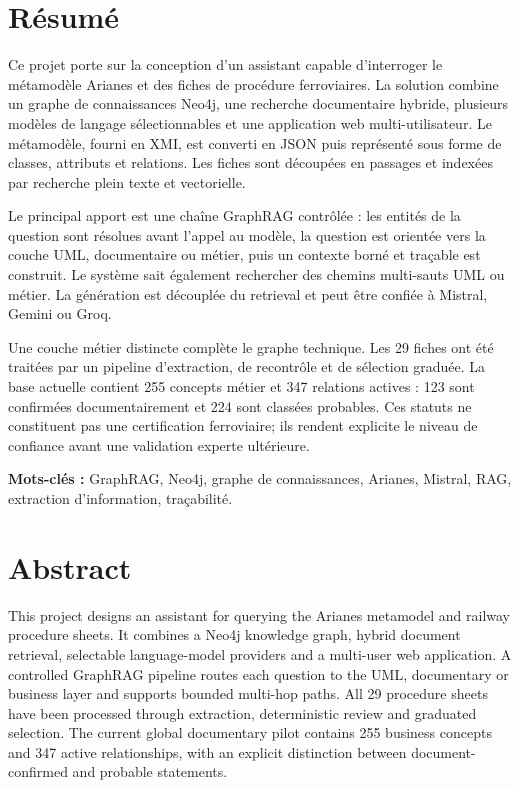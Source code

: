\chapter*{Résumé}

Ce projet porte sur la conception d'un assistant capable d'interroger le métamodèle Arianes et des fiches de procédure ferroviaires. La solution combine un graphe de connaissances Neo4j, une recherche documentaire hybride, plusieurs modèles de langage sélectionnables et une application web multi-utilisateur. Le métamodèle, fourni en XMI, est converti en JSON puis représenté sous forme de classes, attributs et relations. Les fiches sont découpées en passages et indexées par recherche plein texte et vectorielle.

Le principal apport est une chaîne GraphRAG contrôlée : les entités de la question sont résolues avant l'appel au modèle, la question est orientée vers la couche UML, documentaire ou métier, puis un contexte borné et traçable est construit. Le système sait également rechercher des chemins multi-sauts UML ou métier. La génération est découplée du retrieval et peut être confiée à Mistral, Gemini ou Groq.

Une couche métier distincte complète le graphe technique. Les 29 fiches ont été traitées par un pipeline d'extraction, de recontrôle et de sélection graduée. La base actuelle contient 255 concepts métier et 347 relations actives : 123 sont confirmées documentairement et 224 sont classées probables. Ces statuts ne constituent pas une certification ferroviaire; ils rendent explicite le niveau de confiance avant une validation experte ultérieure.

\textbf{Mots-clés :} GraphRAG, Neo4j, graphe de connaissances, Arianes, Mistral, RAG, extraction d'information, traçabilité.

\chapter*{Abstract}

This project designs an assistant for querying the Arianes metamodel and railway procedure sheets. It combines a Neo4j knowledge graph, hybrid document retrieval, selectable language-model providers and a multi-user web application. A controlled GraphRAG pipeline routes each question to the UML, documentary or business layer and supports bounded multi-hop paths. All 29 procedure sheets have been processed through extraction, deterministic review and graduated selection. The current global documentary pilot contains 255 business concepts and 347 active relationships, with an explicit distinction between document-confirmed and probable statements.

